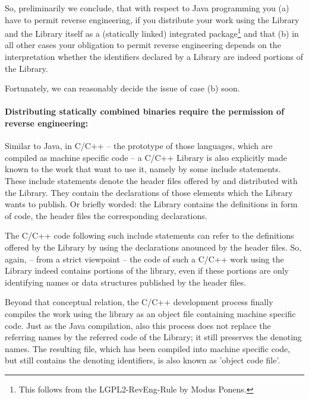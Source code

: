 So, preliminarily we conclude, that with respect to Java programming you (a)
have to permit reverse engineering, if you distribute your work using the
Library and the Library itself as a (statically linked) integrated
package\footnote{This follows from the LGPL2-RevEng-Rule by Modus Ponens.} and
that (b) in all other cases your obligation to permit reverse engineering
depends on the interpretation whether the identifiers declared by a Library are
indeed portions of the Library.

Fortunately, we can reasonably decide the issue of case (b) soon.

\paragraph{Distributing statically combined binaries require the
permission of reverse engineering:}
\label{RevEngDistributeStaticallyLinkedBinaries}
Similar to Java, in C/C++ -- the prototype of those languages, which are
compiled as machine specific code -- a C/C++ Library is also explicitly made
known to the work that want to use it, namely by some include statements. These
include statements denote the header files offered by and distributed with the
Library. They contain the declarations of those elements which the Library wants
to publish. Or briefly worded: the Library contains the definitions in form of
code, the header files the corresponding declarations.

The C/C++ code following such include statements can refer to the definitions
offered by the Library by using the declarations anounced by the header files.
So, again, -- from a strict viewpoint -- the code of such a C/C++ work using the
Library indeed contains portions of the library, even if these portions are only
identifying names or data structures published by the header files.

Beyond that conceptual relation, the C/C++ development process finally compiles
the work using the library as an object file containing machine specific code.
Just as the Java compilation, also this process does not replace the referring
names by the referred code of the Library; it still preserves the denoting
names. The resulting file, which has been compiled into machine specific code,
but still contains the denoting identifiers, is also known as 'object code
file'.

